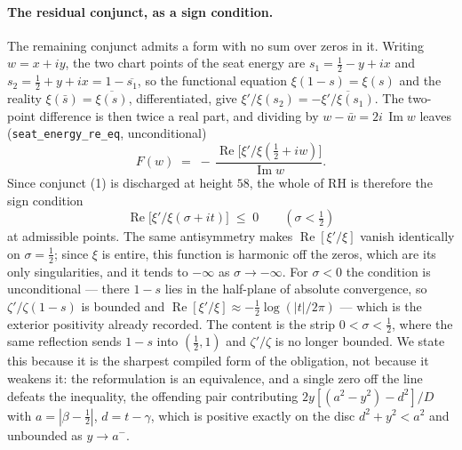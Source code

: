 \documentclass[11pt]{article}
\theoremstyle{plain}
\theoremstyle{definition}
\theoremstyle{remark}
\begin{document}
\paragraph{The residual conjunct, as a sign condition.}
The remaining conjunct admits a form with no sum over zeros in it. Writing
$w=x+iy$, the two chart points of the seat energy are
$s_1=\tfrac12-y+ix$ and $s_2=\tfrac12+y+ix=1-\overline{s_1}$, so the
functional equation $\xi(1-s)=\xi(s)$ and the reality $\xi(\bar
s)=\overline{\xi(s)}$, differentiated, give
$\xi'/\xi(s_2)=-\overline{\xi'/\xi(s_1)}$. The two-point difference is then
twice a real part, and dividing by $w-\bar w=2i\,\operatorname{Im}w$ leaves
(\texttt{seat\_energy\_re\_eq}, unconditional)
\[
  F(w)\;=\;-\,\frac{\operatorname{Re}\bigl[\xi'/\xi(\tfrac12+iw)\bigr]}
                  {\operatorname{Im}w}.
\]
Since conjunct (1) is discharged at height $58$, the whole of RH is therefore
the sign condition
\[
  \operatorname{Re}\bigl[\xi'/\xi(\sigma+it)\bigr]\;\le\;0
  \qquad(\sigma<\tfrac12)
\]
at admissible points. The same antisymmetry makes $\operatorname{Re}[\xi'/\xi]$
vanish identically on $\sigma=\tfrac12$; since $\xi$ is entire, this function is
harmonic off the zeros, which are its only singularities, and it tends to
$-\infty$ as $\sigma\to-\infty$. For $\sigma<0$ the condition is
unconditional --- there $1-s$ lies in the half-plane of absolute convergence,
so $\zeta'/\zeta(1-s)$ is bounded and
$\operatorname{Re}[\xi'/\xi]\approx-\tfrac12\log(|t|/2\pi)$ --- which is the
exterior positivity already recorded. The content is the strip
$0<\sigma<\tfrac12$, where the same reflection sends $1-s$ into
$(\tfrac12,1)$ and $\zeta'/\zeta$ is no longer bounded. We state this because
it is the sharpest compiled form of the obligation, not because it weakens
it: the reformulation is an equivalence, and a single zero off the line
defeats the inequality, the offending pair contributing
$2y[(a^2-y^2)-d^2]/D$ with $a=|\beta-\tfrac12|$, $d=t-\gamma$, which is
positive exactly on the disc $d^2+y^2<a^2$ and unbounded as $y\to a^-$.
\end{document}
